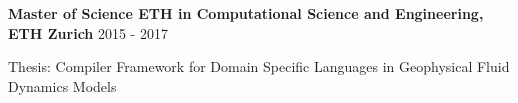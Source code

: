 
\textbf{Master of Science ETH in Computational Science and Engineering, ETH Zurich} \hfill 2015 - 2017

Thesis: Compiler Framework for Domain Specific Languages in Geophysical Fluid Dynamics Models